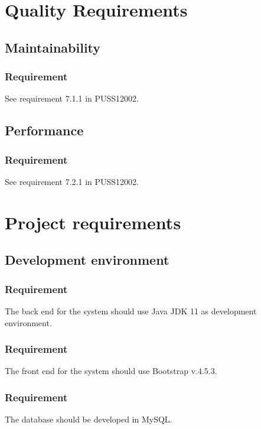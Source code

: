 \documentclass{article}
\begin{document}
\section{Quality Requirements}
\subsection{Maintainability}
\subsubsection{Requirement}
See requirement 7.1.1 in PUSS12002.
\subsection{Performance}
\subsubsection{Requirement}
See requirement 7.2.1 in PUSS12002.




\section{Project requirements}
\subsection{Development environment}
\subsubsection{Requirement}
The back end for the system should use Java JDK 11 as development environment.

\subsubsection{Requirement}
The front end for the system should use Bootstrap v.4.5.3.

\subsubsection{Requirement}
The database should be developed in MySQL.
\end{document}
